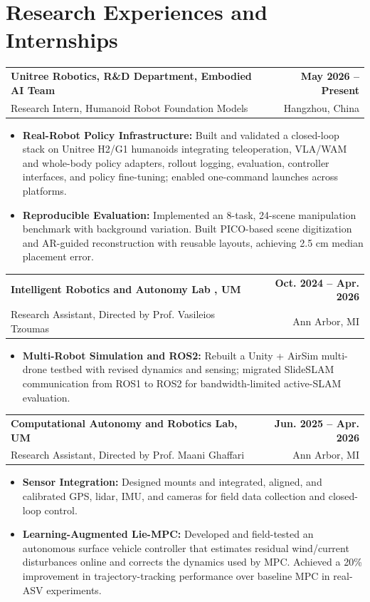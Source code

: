 \documentclass[11pt,letterpaper]{article}
\makeatletter
\newcommand{\resumeSubheading}[4]{
    \begin{tabularx}{\textwidth}{@{}Xr@{}}
        \textbf{#1} & \textbf{#2} \\
        #3 & #4 \\
    \end{tabularx}
}
\newcommand{\resumeItem}[1]{
    \item #1
}
\makeatother
\begin{document}
\section*{Research Experiences and Internships}
\resumeSubheading
{ Unitree Robotics, R\&D Department, Embodied AI Team}
{May 2026 -- Present}
{\hspace*{1.4em}Research Intern, Humanoid Robot Foundation Models}
{Hangzhou, China}
\begin{itemize}[leftmargin=2.4em, itemsep=0.5pt, topsep=0pt]
\small
\resumeItem{\textbf{Real-Robot Policy Infrastructure:} Built and validated a closed-loop stack on Unitree H2/G1 humanoids integrating teleoperation, VLA/WAM and whole-body policy adapters, rollout logging, evaluation, controller interfaces, and policy fine-tuning; enabled one-command launches across platforms.}
\resumeItem{\textbf{Reproducible Evaluation:} Implemented an 8-task, 24-scene manipulation benchmark with background variation. Built PICO-based scene digitization and AR-guided reconstruction with reusable layouts, achieving 2.5 cm median placement error.}
\end{itemize}

\resumeSubheading
{Intelligent Robotics and Autonomy Lab , UM}
{Oct. 2024 -- Apr. 2026}
{\hspace*{1.4em}Research Assistant, Directed by Prof. Vasileios Tzoumas}
{Ann Arbor, MI}
\begin{itemize}[leftmargin=2.4em, itemsep=0.5pt, topsep=0pt]
\small
\resumeItem{\textbf{Multi-Robot Simulation and ROS2:} Rebuilt a Unity + AirSim multi-drone testbed with revised dynamics and sensing; migrated SlideSLAM communication from ROS1 to ROS2 for bandwidth-limited active-SLAM evaluation.}
\end{itemize}

\resumeSubheading
{Computational Autonomy and Robotics Lab, UM }
{Jun. 2025 -- Apr. 2026}
{\hspace*{1.4em}Research Assistant, Directed by Prof. Maani Ghaffari}
{Ann Arbor, MI}
\begin{itemize}[leftmargin=2.4em, itemsep=0.5pt, topsep=0pt]
\small
\resumeItem{\textbf{Sensor Integration:} Designed mounts and integrated, aligned, and calibrated GPS, lidar, IMU, and cameras for field data collection and closed-loop control.}
\resumeItem{\textbf{Learning-Augmented Lie-MPC:} Developed and field-tested an autonomous surface vehicle controller that estimates residual wind/current disturbances online and corrects the dynamics used by MPC. Achieved a 20\% improvement in trajectory-tracking performance over baseline MPC in real-ASV experiments.}
\end{itemize}
\end{document}
